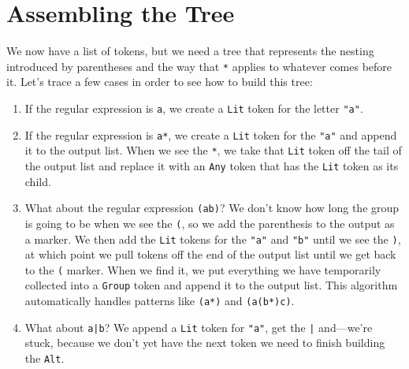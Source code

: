 \documentclass{scrbook}
\begin{document}
\section{Assembling the Tree}\label{parser-tree}


We now have a list of tokens,
but we need a tree that represents the nesting introduced by parentheses
and the way that \texttt{*} applies to whatever comes before it.
Let's trace a few cases in order to see how to build this tree:

\begin{enumerate}

\item 

If the regular expression is \texttt{a}, we create a \texttt{Lit} token for the letter \texttt{"a"}.



\item 

If the regular expression is \texttt{a*},
    we create a \texttt{Lit} token for the \texttt{"a"} and append it to the output list.
    When we see the \texttt{*},
    we take that \texttt{Lit} token off the tail of the output list
    and replace it with an \texttt{Any} token that has the \texttt{Lit} token as its child.



\item 

What about the regular expression \texttt{(ab)}?
    We don't know how long the group is going to be when we see the \texttt{(},
    so we add the parenthesis to the output as a marker.
    We then add the \texttt{Lit} tokens for the \texttt{"a"} and \texttt{"b"} until we see the \texttt{)},
    at which point we pull tokens off the end of the output list
    until we get back to the \texttt{(} marker.
    When we find it,
    we put everything we have temporarily collected into a \texttt{Group} token and append it to the output list.
    This algorithm automatically handles patterns like \texttt{(a*)} and \texttt{(a(b*)c)}.



\item 

What about \texttt{a|b}?
    We append a \texttt{Lit} token for \texttt{"a"}, get the \texttt{|} and—we're stuck,
    because we don't yet have the next token we need to finish building the \texttt{Alt}.



\end{enumerate}
\end{document}
